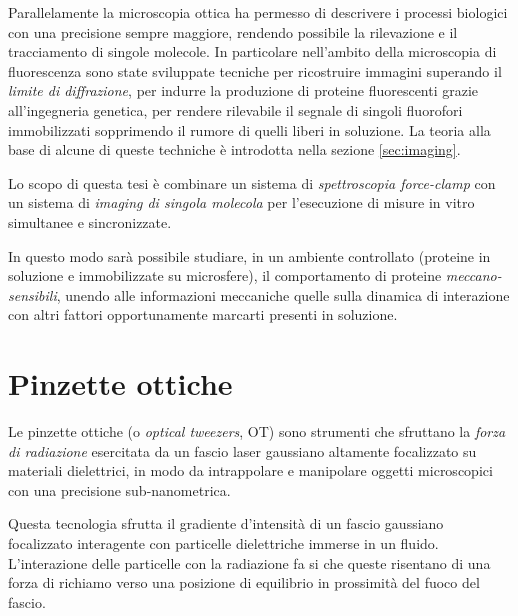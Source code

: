 Parallelamente la microscopia ottica ha permesso di descrivere i
processi biologici con una precisione sempre maggiore, rendendo
possibile la rilevazione e il tracciamento di singole molecole.
In particolare nell'ambito della microscopia di fluorescenza sono
state sviluppate tecniche per ricostruire immagini superando il
\emph{limite di diffrazione}, per indurre la produzione di proteine
fluorescenti grazie all'ingegneria genetica, per rendere rilevabile
il segnale di singoli fluorofori immobilizzati sopprimendo il rumore
di quelli liberi in soluzione.
La teoria alla base di alcune di queste techniche è introdotta
nella sezione \ref{sec:imaging}.

Lo scopo di questa tesi è combinare un sistema di \emph{spettroscopia force-clamp} con un sistema di \emph{imaging di singola molecola} per l'esecuzione di misure in vitro simultanee e sincronizzate.

In questo modo sarà possibile studiare, in un ambiente
controllato (proteine in soluzione e immobilizzate su microsfere),
il comportamento di proteine \emph{meccano-sensibili}, unendo alle
informazioni meccaniche quelle sulla dinamica di interazione
con altri fattori opportunamente marcarti presenti in soluzione.










\section{Pinzette ottiche}
\label{sec:ot}


Le pinzette ottiche (o \textit{optical tweezers}, OT) sono strumenti che sfruttano la \emph{forza di radiazione} esercitata da un fascio laser gaussiano altamente focalizzato su materiali dielettrici, in modo da intrappolare e manipolare oggetti microscopici con una precisione sub-nanometrica.

Questa tecnologia sfrutta il gradiente d'intensità di un fascio
gaussiano focalizzato interagente con particelle dielettriche immerse
in un fluido. L'interazione delle particelle con la radiazione fa si
che queste risentano di una forza di richiamo verso una posizione
di equilibrio in prossimità del fuoco del fascio.

